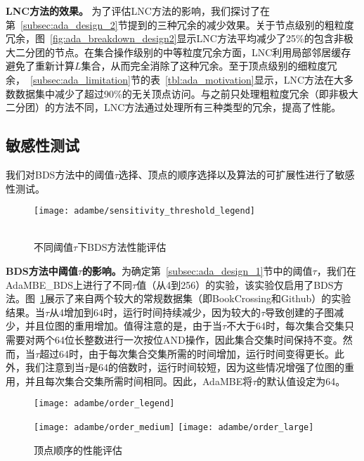 \textbf{LNC方法的效果。} 为了评估LNC方法的影响，我们探讨了在第~\ref{subsec:ada_design_2}节提到的三种冗余的减少效果。关于节点级别的粗粒度冗余，图~\ref{fig:ada_breakdown_design2}显示LNC方法平均减少了25\%的包含非极大二分团的节点。在集合操作级别的中等粒度冗余方面，LNC利用局部邻居缓存避免了重新计算$L$集合，从而完全消除了这种冗余。至于顶点级别的细粒度冗余，~\ref{subsec:ada_limitation}节的表~\ref{tbl:ada_motivation}显示，LNC方法在大多数数据集中减少了超过90\%的无关顶点访问。与之前只处理粗粒度冗余（即非极大二分团）的方法不同，LNC方法通过处理所有三种类型的冗余，提高了性能。

\subsection{敏感性测试}
\label{subsec:ada_eval_sensitivity}

我们对BDS方法中的阈值$\tau$选择、顶点的顺序选择以及算法的可扩展性进行了敏感性测试。


\begin{figure} [H]
	\centering
  \texttt{[image: adambe/sensitivity\_threshold\_legend]} \\
	\\

	\caption{不同阈值$\tau$下BDS方法性能评估}
	\label{fig:ada_sensitivity_threshold}

\end{figure}

\textbf{BDS方法中阈值$\tau$的影响。}为确定第~\ref{subsec:ada_design_1}节中的阈值$\tau$，我们在AdaMBE\_BDS上进行了不同$\tau$值（从4到256）的实验，该实验仅启用了BDS方法。图~\ref{fig:ada_sensitivity_threshold}展示了来自两个较大的常规数据集（即BookCrossing和Github）的实验结果。当$\tau$从4增加到64时，运行时间持续减少，因为较大的$\tau$导致创建的子图减少，并且位图的重用增加。值得注意的是，由于当$\tau$不大于64时，每次集合交集只需要对两个64位长整数进行一次按位AND操作，因此集合交集时间保持不变。然而，当$\tau$超过64时，由于每次集合交集所需的时间增加，运行时间变得更长。此外，我们注意到当$\tau$是64的倍数时，运行时间较短，因为这些情况增强了位图的重用，并且每次集合交集所需时间相同。因此，AdaMBE将$\tau$的默认值设定为64。


\begin{figure} [H]
	\centering
  \texttt{[image: adambe/order\_legend]}
  

		\texttt{[image: adambe/order\_medium]}
  \quad
		\texttt{[image: adambe/order\_large]}

	\caption{顶点顺序的性能评估}
	\label{fig:ada_order}

\end{figure}

